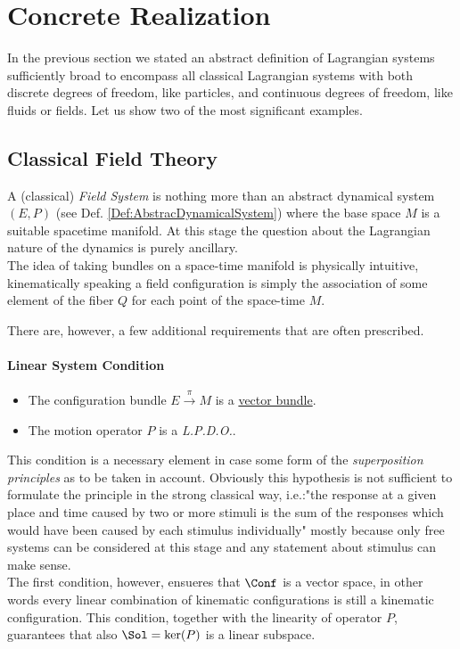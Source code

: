 \documentclass[Main]{subfiles}
\begin{document}
	\section{Concrete Realization}
		In the previous section we stated an abstract definition of Lagrangian systems sufficiently broad to encompass all  classical Lagrangian systems with both discrete degrees of freedom, like particles, and continuous degrees of freedom, like fluids or fields.
	Let us show two of the most significant examples.
	
	
	
		\subsection{Classical Field Theory}\label{Section:CFT}
		A (classical) \emph{Field System} is nothing more than an abstract dynamical system $(E,P)$ (see Def. \ref{Def:AbstracDynamicalSystem}) where the base space $M$  is a suitable spacetime manifold\cite{Bar}. At this stage the question about the Lagrangian nature of the dynamics is purely ancillary.
		\\		
		The idea of taking bundles on a space-time manifold is physically intuitive, kinematically speaking a field configuration is simply the association of some element of the fiber $Q $ for each point of the space-time $M$.
		
		There are, however, a few additional requirements that are often prescribed.
		\paragraph{Linear System Condition}		
			\begin{itemize}
				 \item The configuration bundle $E\xrightarrow{\pi} M$ is a \underline{vector bundle}.
				 \item The motion operator $P$ is a \emph{L.P.D.O.}.
			\end{itemize}
			This condition is a necessary element in case some form of the \emph{superposition principles} as to be taken in account. 
			Obviously this hypothesis is not sufficient to formulate the principle in the strong classical way, i.e.:"the response at a given place and time caused by two or more stimuli is the sum of the responses which would have been caused by each stimulus individually" mostly because only free systems can be considered at this stage and any statement about stimulus can make sense.
			\\
			The first condition, however, ensueres that $\Conf$ is a vector space, in other words every linear combination of kinematic configurations is still a kinematic configuration.
			This condition, together with the linearity of operator $P$,  guarantees that also $\Sol= \ker(P)$ is a linear subspace.		
			 
\end{document}
